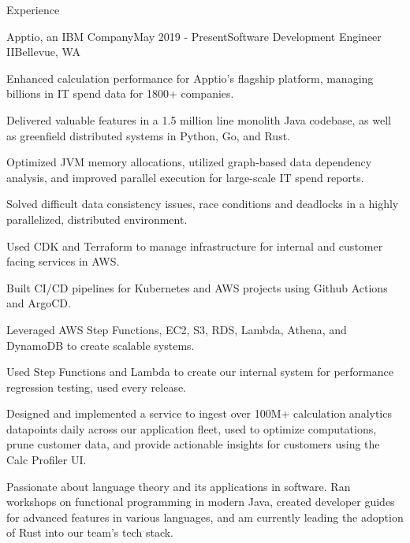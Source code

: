 \documentclass[
	11pt, %
]{resume} %
\begin{document}
\begin{rSection}{Experience}

   \begin{rSubsection}{Apptio, an IBM Company}{May 2019 - Present}{Software Development Engineer II}{Bellevue, WA}
        \item Enhanced calculation performance for Apptio's flagship platform, managing billions in IT spend data for 1800+ companies.
        \item Delivered valuable features in a 1.5 million line monolith Java codebase, as well as greenfield distributed systems in Python, Go, and Rust.
        \item Optimized JVM memory allocations, utilized graph-based data dependency analysis, and improved parallel execution for large-scale IT spend reports.
        \item Solved difficult data consistency issues, race conditions and deadlocks in a highly parallelized,
            distributed environment.
        \item Used CDK and Terraform to manage infrastructure for internal and customer facing services in AWS.
        \item Built CI/CD pipelines for Kubernetes and AWS projects using Github Actions and ArgoCD.
        \item Leveraged AWS Step Functions, EC2, S3, RDS, Lambda, Athena, and DynamoDB to create scalable systems.
        \item Used Step Functions and Lambda to create our internal system for performance regression testing, used every release.
        \item Designed and implemented a service to ingest over 100M+ calculation analytics datapoints daily across
            our application fleet, used to optimize computations, prune customer data, and provide actionable insights for customers using the Calc Profiler UI.
        \item Passionate about language theory and its applications in software. Ran workshops on functional
            programming in modern Java, created developer guides for advanced features in various languages, 
            and am currently leading the adoption of Rust into our team's tech stack.
   \end{rSubsection}


\end{rSection}
\end{document}
